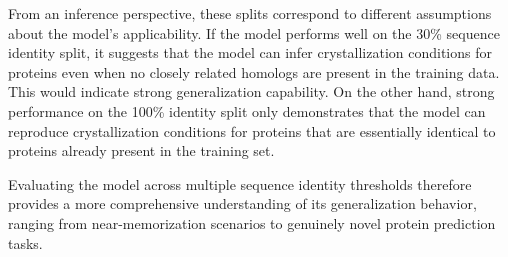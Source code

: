 From an inference perspective, these splits correspond to different assumptions about the model's applicability. If the model performs well on the 30\% sequence identity split, it suggests that the model can infer crystallization conditions for proteins even when no closely related homologs are present in the training data. This would indicate strong generalization capability. On the other hand, strong performance on the 100\% identity split only demonstrates that the model can reproduce crystallization conditions for proteins that are essentially identical to proteins already present in the training set.

Evaluating the model across multiple sequence identity thresholds therefore provides a more comprehensive understanding of its generalization behavior, ranging from near-memorization scenarios to genuinely novel protein prediction tasks. 
